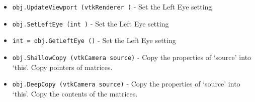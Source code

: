 \begin{itemize}
\item  \verb|obj.UpdateViewport (vtkRenderer )| -  Set the Left Eye setting

\item  \verb|obj.SetLeftEye (int )| -  Set the Left Eye setting

\item  \verb|int = obj.GetLeftEye ()| -  Set the Left Eye setting

\item  \verb|obj.ShallowCopy (vtkCamera source)| -  Copy the properties of `source' into `this'.
 Copy pointers of matrices.
 
 

\item  \verb|obj.DeepCopy (vtkCamera source)| -  Copy the properties of `source' into `this'.
 Copy the contents of the matrices.
 
 

\end{itemize}
